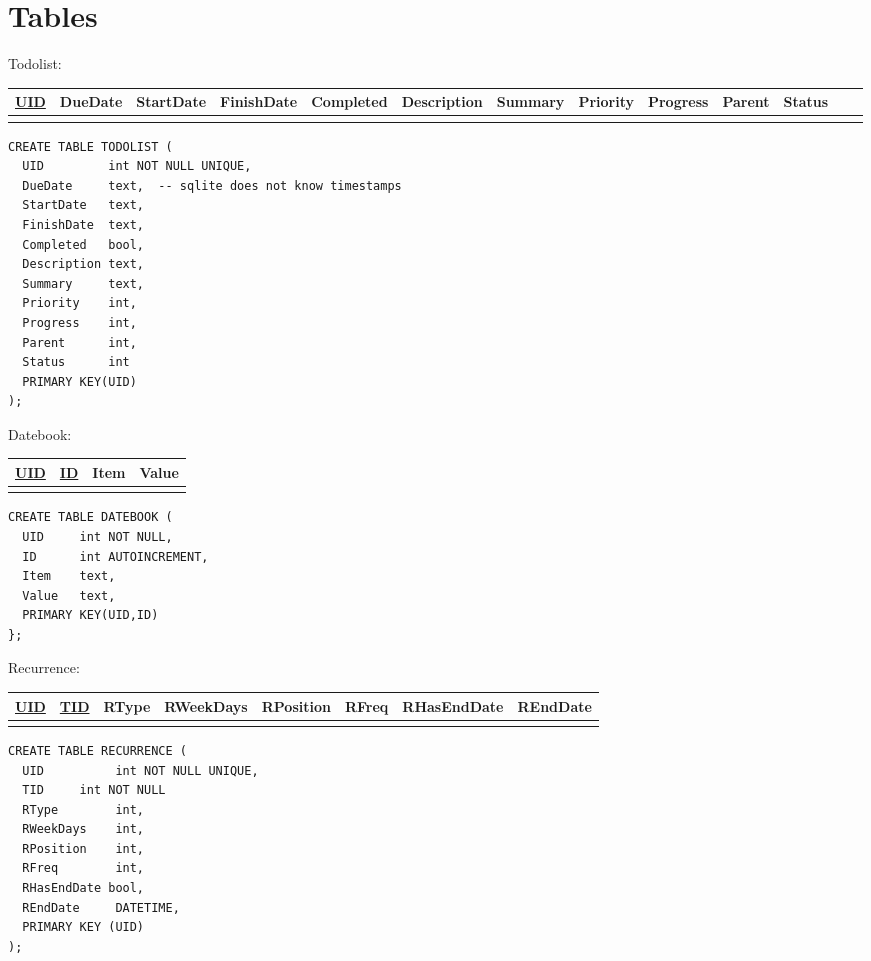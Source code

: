 \pagebreak

\section{Tables}

\noindent
Todolist:\\
\begin{tabular}[ht]{|l|l|l|l|l|l|l|l|l|l|l|l|l|}
\hline
\underline{UID} & DueDate & StartDate & FinishDate & Completed & Description & Summary & Priority & Progress & Parent & Status \\
\hline
 & & & & & & & & & & & &\\
\hline
\end{tabular}
\begin{verbatim}
CREATE TABLE TODOLIST (
  UID         int NOT NULL UNIQUE,
  DueDate     text,  -- sqlite does not know timestamps
  StartDate   text,
  FinishDate  text,
  Completed   bool,
  Description text,
  Summary     text,
  Priority    int,
  Progress    int,
  Parent      int,
  Status      int
  PRIMARY KEY(UID)
);      
\end{verbatim}


\noindent
Datebook: \\
\begin{tabular}[ht]{|l|l|l|l|}
\hline
\underline{UID} & \underline{ID} & Item & Value\\
\hline
 & & & \\
\hline
\end{tabular}

\begin{verbatim}
CREATE TABLE DATEBOOK (
  UID     int NOT NULL,
  ID      int AUTOINCREMENT,
  Item    text,
  Value   text,
  PRIMARY KEY(UID,ID)
};
\end{verbatim} 


\noindent
Recurrence:\\
\begin{tabular}[ht]{|l|l|l|l|l|l|l|l|}
\hline
\underline{UID} & \underline{TID} & RType & RWeekDays & RPosition & RFreq & RHasEndDate &REndDate  \\
\hline
 & & & & & & &\\
\hline
\end{tabular}
\begin{verbatim}
CREATE TABLE RECURRENCE (
  UID          int NOT NULL UNIQUE,
  TID 	  int NOT NULL
  RType        int,
  RWeekDays    int,
  RPosition    int,
  RFreq        int,
  RHasEndDate bool,
  REndDate     DATETIME,
  PRIMARY KEY (UID)
);
\end{verbatim}

